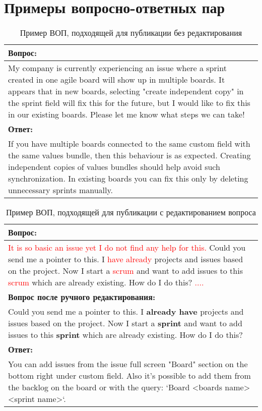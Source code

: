 \chapter{Примеры вопросно-ответных пар}
\label{appx03}

\begin{table}[tph!]
\caption{Пример ВОП, подходящей для публикации без редактирования}
\label{vop_ok}
\centering
\begin{tabular}{|L{11cm}|}
\hline
\textbf{Вопрос:}\\
\hline
My company is currently experiencing an issue where a sprint created in one agile board will show up in multiple boards. It appears that in new boards, selecting "create independent copy" in the sprint field will fix this for the future, but I would like to fix this in our existing boards. Please let me know what steps we can take!\\
\hline
\textbf{Ответ:}\\
\hline
If you have multiple boards connected to the same custom field with the same values bundle, then this behaviour is as expected. Creating independent copies of values bundles should help avoid such synchronization. In existing boards you can fix this only by deleting unnecessary sprints manually.\\
\hline
\end{tabular}
\end{table}

\begin{table}[tph!]
\caption{Пример ВОП, подходящей для публикации с редактированием вопроса}
\label{vop_ok}
\centering
\begin{tabular}{|L{11cm}|}
\hline
\textbf{Вопрос:}\\
\hline
\textcolor{red}{It is so basic an issue yet I do not find any help for this.} Could you send me a pointer to this. I \textcolor{red}{have already} projects and issues based on the project. Now I start a \textcolor{red}{scrum} and want to add issues to this \textcolor{red}{scrum} which are already existing. How do I do this? \textcolor{red}{....}\\
\hline
\textbf{Вопрос после ручного редактирования:}\\
\hline
Could you send me a pointer to this. I \textbf{already have} projects and issues based on the project. Now I start a \textbf{sprint} and want to add issues to this \textbf{sprint} which are already existing. How do I do this?\\
\hline
\textbf{Ответ:}\\
\hline
You can add issues from the issue full screen "Board" section on the bottom right under custom field. Also it's possible to add them from the backlog on the board or with the query: `Board <boards name> <sprint name>`.
\\
\hline
\end{tabular}
\end{table}

